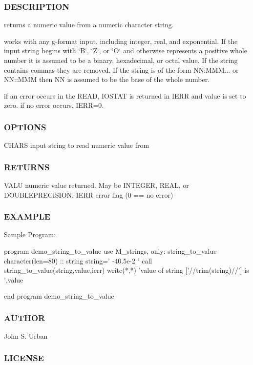  \subsubsection*{D\+E\+S\+C\+R\+I\+P\+T\+I\+ON}

returns a numeric value from a numeric character string.

works with any g-\/format input, including integer, real, and exponential. If the input string begins with \char`\"{}\+B\char`\"{}, \char`\"{}\+Z\char`\"{}, or \char`\"{}\+O\char`\"{} and otherwise represents a positive whole number it is assumed to be a binary, hexadecimal, or octal value. If the string contains commas they are removed. If the string is of the form NN\+:M\+MM... or N\+N\+::\+M\+MM then NN is assumed to be the base of the whole number.

if an error occurs in the R\+E\+AD, I\+O\+S\+T\+AT is returned in I\+E\+RR and value is set to zero. if no error occurs, I\+E\+RR=0. \subsubsection*{O\+P\+T\+I\+O\+NS}

C\+H\+A\+RS input string to read numeric value from \subsubsection*{R\+E\+T\+U\+R\+NS}

V\+A\+LU numeric value returned. May be I\+N\+T\+E\+G\+ER, R\+E\+AL, or D\+O\+U\+B\+L\+E\+P\+R\+E\+C\+I\+S\+I\+ON. I\+E\+RR error flag (0 == no error) \subsubsection*{E\+X\+A\+M\+P\+LE}

Sample Program\+: \begin{DoxyVerb}program demo_string_to_value
use M_strings, only: string_to_value
character(len=80) :: string
   string=' -40.5e-2 '
   call string_to_value(string,value,ierr)
   write(*,*) 'value of string ['//trim(string)//'] is ',value
\end{DoxyVerb}
 end program demo\+\_\+string\+\_\+to\+\_\+value \subsubsection*{A\+U\+T\+H\+OR}

John S. Urban \subsubsection*{L\+I\+C\+E\+N\+SE}

